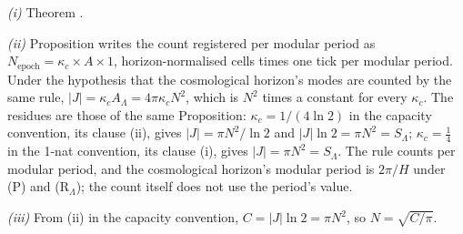 \emph{(i)} Theorem .

\emph{(ii)} Proposition  writes the count registered per modular period as $N_{\mathrm{epoch}} = \kappa_{c} \times A \times 1$, horizon-normalised cells times one tick per modular period. Under the hypothesis that the cosmological horizon's modes are counted by the same rule, $|J| = \kappa_{c}A_{\Lambda} = 4\pi\kappa_{c}N^{2}$, which is $N^{2}$ times a constant for every $\kappa_{c}$. The residues are those of the same Proposition: $\kappa_{c} = 1/(4\ln 2)$ in the capacity convention, its clause (ii), gives $|J| = \pi N^{2}/\ln 2$ and $|J|\ln 2 = \pi N^{2} = S_{\Lambda}$; $\kappa_{c} = \tfrac14$ in the 1-nat convention, its clause (i), gives $|J| = \pi N^{2} = S_{\Lambda}$. The rule counts per modular period, and the cosmological horizon's modular period is $2\pi/H$ under (P) and (R$_{\Lambda}$); the count itself does not use the period's value.

\emph{(iii)} From (ii) in the capacity convention, $C = |J|\ln 2 = \pi N^{2}$, so $N = \sqrt{C/\pi}$.
